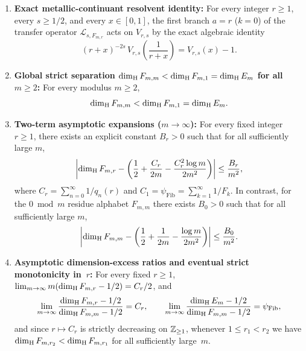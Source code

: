 \begin{theorem}\label{thm:residues-asymptotic}
\begin{enumerate}[label=(\roman*),leftmargin=2.2em]
\item \textbf{Exact metallic-continuant resolvent identity:}
For every integer $r\ge1$, every $s\ge1/2$, and every $x\in[0,1]$, the first
branch $a=r$ ($k=0$) of the transfer operator $\mathcal L_{s,F_{m,r}}$ acts on
$V_{r,s}$ by the exact algebraic identity
\begin{equation}\label{eq:resolvent-branch}
(r+x)^{-2s}\,V_{r,s}\!\left(\frac{1}{r+x}\right)
=V_{r,s}(x)-1.
\end{equation}
\item \textbf{Global strict separation $\dim_{\mathrm{H}} F_{m,m}<\dim_{\mathrm{H}} F_{m,1}=\dim_{\mathrm{H}} E_m$ for all $m\ge2$:}
For every modulus $m\ge2$,
\begin{equation}\label{eq:global-strict-sep}
\dim_{\mathrm{H}} F_{m,m}
<\dim_{\mathrm{H}} F_{m,1}
=\dim_{\mathrm{H}} E_m.
\end{equation}
\item \textbf{Two-term asymptotic expansions ($m\to\infty$):}
For every fixed integer $r\ge1$, there exists an explicit constant $B_r>0$ such
that for all sufficiently large $m$,
\begin{equation}\label{eq:dimH-Fmr-two-term}
\left|\dim_{\mathrm{H}} F_{m,r}-\left(\frac12+\frac{C_r}{2m}-\frac{C_r^2\log m}{2m^2}\right)\right|
\le\frac{B_r}{m^2},
\end{equation}
where $C_r=\sum_{n=0}^\infty 1/q_n(r)$ and $C_1=\psi_{\mathrm{Fib}}=\sum_{k=1}^\infty 1/F_k$.
In contrast, for the $0\bmod m$ residue alphabet $F_{m,m}$ there exists $B_0>0$
such that for all sufficiently large $m$,
\begin{equation}\label{eq:dimH-Fmm-two-term}
\left|\dim_{\mathrm{H}} F_{m,m}-\left(\frac12+\frac{1}{2m}-\frac{\log m}{2m^2}\right)\right|
\le\frac{B_0}{m^2}.
\end{equation}
\item \textbf{Asymptotic dimension-excess ratios and eventual strict monotonicity in~$r$:}
For every fixed $r\ge1$, $\lim_{m\to\infty}m(\dim_{\mathrm{H}} F_{m,r}-1/2)=C_r/2$, and
\[
\lim_{m\to\infty}\frac{\dim_{\mathrm{H}} F_{m,r}-1/2}{\dim_{\mathrm{H}} F_{m,m}-1/2}=C_r,\qquad
\lim_{m\to\infty}\frac{\dim_{\mathrm{H}} E_m-1/2}{\dim_{\mathrm{H}} F_{m,m}-1/2}=\psi_{\mathrm{Fib}},
\]
and since $r\mapsto C_r$ is strictly decreasing on $\mathbb{Z}_{\ge1}$, whenever
$1\le r_1<r_2$ we have $\dim_{\mathrm{H}} F_{m,r_2}<\dim_{\mathrm{H}} F_{m,r_1}$ for all sufficiently
large~$m$.
\end{enumerate}
\end{theorem}

